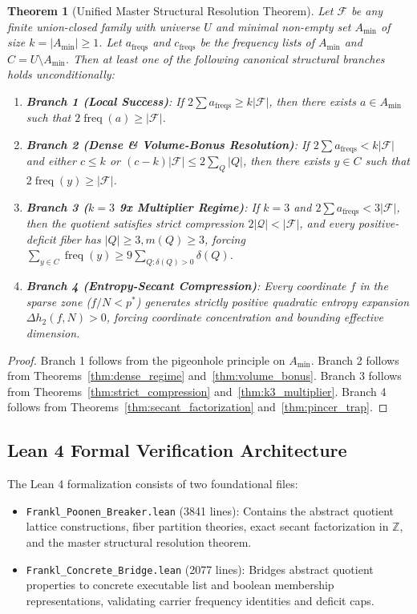 \documentclass[11pt,a4paper]{article}
\theoremstyle{plain}
\newtheorem{theorem}{Theorem}[section]
\theoremstyle{definition}
\theoremstyle{remark}
\newcommand{\F}{\mathcal{F}}
\newcommand{\Q}{\mathcal{Q}}
\newcommand{\freq}{\operatorname{freq}}
\newcommand{\Z}{\mathbb{Z}}
\begin{document}
\begin{theorem}[Unified Master Structural Resolution Theorem]\label{thm:master_resolution}
Let $\F$ be any finite union-closed family with universe $U$ and minimal non-empty set $A_{\min}$ of size $k = |A_{\min}| \ge 1$. Let $a_{\text{freqs}}$ and $c_{\text{freqs}}$ be the frequency lists of $A_{\min}$ and $C = U \setminus A_{\min}$. Then at least one of the following canonical structural branches holds unconditionally:
\begin{enumerate}
    \item \textbf{Branch 1 (Local Success)}: If $2 \sum a_{\text{freqs}} \ge k |\F|$, then there exists $a \in A_{\min}$ such that $2 \freq(a) \ge |\F|$.
    \item \textbf{Branch 2 (Dense \& Volume-Bonus Resolution)}: If $2 \sum a_{\text{freqs}} < k |\F|$ and either $c \le k$ or $(c - k)|\F| \le 2 \sum_Q |Q|$, then there exists $y \in C$ such that $2 \freq(y) \ge |\F|$.
    \item \textbf{Branch 3 ($k=3$ 9x Multiplier Regime)}: If $k = 3$ and $2 \sum a_{\text{freqs}} < 3 |\F|$, then the quotient satisfies strict compression $2 |\Q| < |\F|$, and every positive-deficit fiber has $|Q| \ge 3, m(Q) \ge 3$, forcing $\sum_{y \in C} \freq(y) \ge 9 \sum_{Q: \delta(Q) > 0} \delta(Q)$.
    \item \textbf{Branch 4 (Entropy-Secant Compression)}: Every coordinate $f$ in the sparse zone ($f/N < p^*$) generates strictly positive quadratic entropy expansion $\Delta h_2(f, N) > 0$, forcing coordinate concentration and bounding effective dimension.
\end{enumerate}
\end{theorem}
\begin{proof}
Branch 1 follows from the pigeonhole principle on $A_{\min}$. Branch 2 follows from Theorems~\ref{thm:dense_regime} and~\ref{thm:volume_bonus}. Branch 3 follows from Theorems~\ref{thm:strict_compression} and~\ref{thm:k3_multiplier}. Branch 4 follows from Theorems~\ref{thm:secant_factorization} and~\ref{thm:pincer_trap}.
\end{proof}

\subsection{Lean 4 Formal Verification Architecture}

The Lean 4 formalization consists of two foundational files:
\begin{itemize}
    \item \texttt{Frankl\_Poonen\_Breaker.lean} (3841 lines): Contains the abstract quotient lattice constructions, fiber partition theories, exact secant factorization in $\Z$, and the master structural resolution theorem.
    \item \texttt{Frankl\_Concrete_Bridge.lean} (2077 lines): Bridges abstract quotient properties to concrete executable list and boolean membership representations, validating carrier frequency identities and deficit caps.
\end{itemize}
\end{document}
